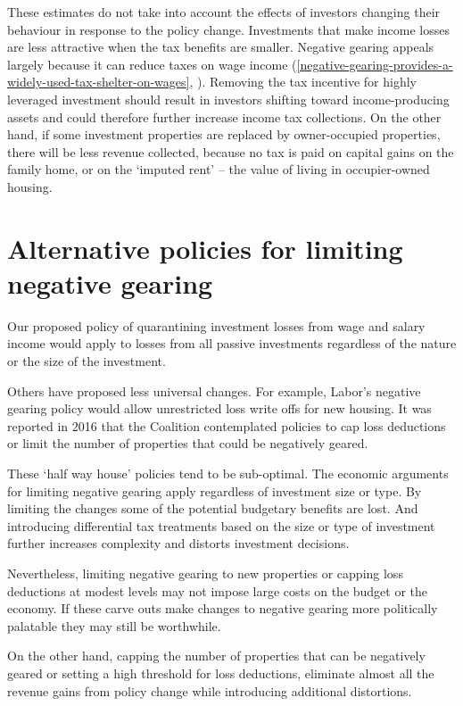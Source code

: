 \documentclass{grattan}\usepackage[]{graphicx}\usepackage[]{color}
\begin{document}
These estimates do not take into account the effects of investors changing their behaviour in response to the policy change. Investments that make income losses are less attractive when the tax benefits are smaller. Negative gearing appeals largely because it can reduce taxes on wage income (\cref{negative-gearing-provides-a-widely-used-tax-shelter-on-wages}, ). Removing the tax incentive for highly leveraged investment should result in investors shifting toward income-producing assets and could therefore further increase income tax collections. On the other hand, if some investment properties are replaced by owner-occupied properties, there will be less revenue collected, because no tax is paid on capital gains on the family home, or on the `imputed rent' -- the value of living in occupier-owned housing.

\section{Alternative policies for limiting negative gearing}
Our proposed policy of quarantining investment losses from wage and salary income would apply to losses from all passive investments regardless of the nature or the size of the investment. 

Others have proposed less universal changes. For example, Labor's negative gearing policy would allow unrestricted loss write offs for new housing.  It was reported in 2016 that the Coalition contemplated policies to cap loss deductions or limit the number of properties that could be negatively geared. 

These `half way house' policies tend to be sub-optimal. The economic arguments for limiting negative gearing apply regardless of investment size or type. By limiting the changes some of the potential budgetary benefits are lost. And introducing differential tax treatments based on the size or type of investment further increases complexity and distorts investment decisions. 

Nevertheless, limiting negative gearing to new properties or capping loss deductions at modest levels may not impose large costs on the budget or the economy. If these carve outs make changes to negative gearing more politically palatable they may still be worthwhile.

On the other hand, capping the number of properties that can be negatively geared or setting a high threshold for loss deductions, eliminate almost all the revenue gains from policy change while introducing additional distortions. 
\end{document}

